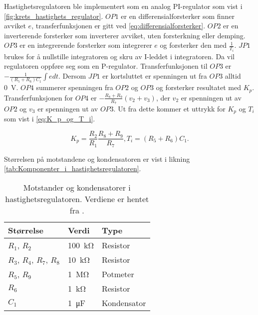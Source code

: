 Hastighetsregulatoren ble implementert som en analog PI-regulator som vist i \autoref{fig:krets_hastighets_regulator}. $OP1$ er en differensialforsterker som finner avviket $e$, transferfunksjonen er gitt ved \eqref{eq:differensialforsterker}.
$OP2$ er en inverterende forsterker som inverterer avviket, uten forsterkning eller demping.
$OP3$ er en integrerende forsterker som integrerer $e$ og forsterker den med $\frac{1}{T_i}$. $JP1$ brukes for å nullstille integratoren og skru av I-leddet i integratoren. Da vil regulatoren oppføre seg som en P-regulator. Transferfunksjonen til $OP3$ er $-\frac{1}{(R_5 + R_6) C_1} \int e dt$. Dersom $JP1$ er kortsluttet er spenningen ut fra $OP3$ alltid {\SI{0}{\volt}}.
$OP4$ summerer spenningen fra $OP2$ og $OP3$ og forsterker resultatet med $K_p$. Transferfunksjonen for $OP4$ er $-\frac{R_8 + R_9}{R_7}(v_2 + v_3)$, der $v_2$ er spenningen ut av $OP2$ og $v_3$ er spenningen ut av $OP3$. Ut fra dette kommer et uttrykk for $K_p$ og $T_i$ som vist i \eqref{eq:K_p_og_T_i}.

\begin{equation}
    \label{eq:K_p_og_T_i}
    K_p = \frac{R_2}{R_1} \frac{R_8 + R_9}{R_7}, 
    T_i = (R_5 + R_6) C_1.
\end{equation}

Størrelsen på motstandene og kondensatoren er vist i likning \eqref{tab:Komponenter_i_hastighetsregulatoren}.

\begin{table}[h]
    \centering
    \caption{Motstander og kondensatorer i hastighetsregulatoren. Verdiene er hentet fra \cite{AnalogMotorlabbOppgaver}.}
    \begin{tabular}{lll}
        \toprule
        Størrelse & Verdi & Type \\
		\midrule
        $R_1$, $R_2$ & \SI{100}{\kilo\ohm} & Resistor\\
        $R_3$, $R_4$, $R_7$, $R_8$ & \SI{10}{\kilo\ohm} & Resistor \\
        $R_5$, $R_9$ & \SI{1}{\mega\ohm} & Potmeter \\
        $R_6$ & \SI{1}{\kilo\ohm} & Resistor \\
        $C_1$ & \SI{1}{\micro\farad} & Kondensator \\
        \bottomrule
    \end{tabular}
    \label{tab:Komponenter_i_hastighetsregulatoren}
\end{table}






